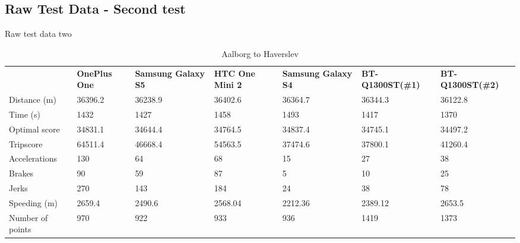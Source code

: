 \subsection*{Raw Test Data - Second test}\label{app:rawtestdata2}
Raw test data two

\begin{table}[]
\centering
\caption{Aalborg to Haverslev}
\label{my-label}
\begin{tabular}{|l|llllll|}
\hline
\rowcolor{tablegreen}

                 & \textbf{OnePlus One} & \textbf{Samsung Galaxy S5} & \textbf{HTC One Mini 2} & \textbf{Samsung Galaxy S4} & \textbf{BT-Q1300ST(\#1)} & \textbf{BT-Q1300ST(\#2)} \\
Distance (m)     & 36396.2     & 36238.9           & 36402.6        & 36364.7           & 36344.3         & 36122.8         \\
Time (s)         & 1432        & 1427              & 1458           & 1493              & 1417            & 1370            \\
Optimal score    & 34831.1     & 34644.4           & 34764.5        & 34837.4           & 34745.1         & 34497.2         \\
Tripscore        & 64511.4     & 46668.4           & 54563.5        & 37474.6           & 37800.1         & 41260.4         \\
Accelerations    & 130         & 64                & 68             & 15                & 27              & 38              \\
Brakes           & 90          & 59                & 87             & 5                 & 10              & 25              \\
Jerks            & 270         & 143               & 184            & 24                & 38              & 78              \\
Speeding (m)     & 2659.4      & 2490.6            & 2568.04        & 2212.36           & 2389.12         & 2653.5          \\
Number of points & 970         & 922               & 933            & 936               & 1419            & 1373            \\\hline           
\end{tabular}
\end{table}

